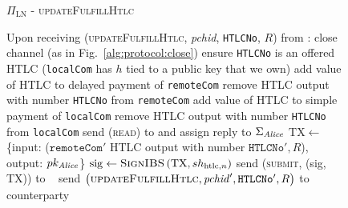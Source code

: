   \begin{figure}[H]
    \begin{protocolbox}{$\Pi_{\mathrm{LN}}$ - \textsc{updateFulfillHtlc}}
      \begin{algorithmic}[1]
        \State Upon receiving (\textsc{updateFulfillHtlc}, \textit{pchid},
        \texttt{HTLCNo}, $R$) from \bob:
        \Indent
            \State close channel (as in Fig.~\ref{alg:protocol:close})
            \State \Return
          \EndIf
          \State ensure \texttt{HTLCNo} is an offered HTLC (\texttt{localCom}
          has $h$ tied to a public key that we own)
          \State add value of HTLC to delayed payment of \texttt{remoteCom}
          \State remove HTLC output with number \texttt{HTLCNo} from
          \texttt{remoteCom}
          \State add value of HTLC to simple payment of \texttt{localCom}
          \State remove HTLC output with number \texttt{HTLCNo} from
          \texttt{localCom}
           
            \State send (\textsc{read}) to \ledger{} and assign reply to
            $\Sigma_{\mathit{Alice}}$
              \State $\mathrm{TX} \gets$ \{input: ($\mathtt{remoteCom}'$ HTLC
              output with number $\mathtt{HTLCNo}', R$), output:
              $pk_{\mathit{Alice}}$\}
              \State $\mathrm{sig} \gets \textsc{SignIBS}\left(\mathrm{TX},
              sh_{\mathrm{htlc}, n}\right)$
              \State send (\textsc{submit}, (sig, TX)) to \ledger{}
              \label{alg:protocol:pay:updateFulfillHtlc:submit}
            \Else \ 
              \State {}
              \State send $\left(\textsc{updateFulfillHtlc}, \mathit{pchid}',
              \mathtt{HTLCNo}', R\right)$ to counterparty
            \EndIf
          \EndIf
        \EndIndent
      \end{algorithmic}
    \end{protocolbox}
    \caption{}
    \label{alg:protocol:pay:updateFulfillHtlc}
  \end{figure}

